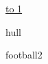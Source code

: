 \documentclass[12pt,a4paper,oneside]{article}
\newcommand{\ProblemLabel}{undefined}
\newcommand{\ProblemTL}{undefined}
\newcommand{\ProblemML}{undefined}
\newcommand{\ProblemName}{undefined}
\def\probl#1#2#3#4#5{
  \renewcommand{\ProblemName}{#2}
  \renewcommand{\ProblemLabel}{#3}
  \renewcommand{\ProblemTL}{#4}
  \renewcommand{\ProblemML}{#5}
  {#2}
}
\begin{document}
\vspace*{-2em}
\tableofcontents

\vspace*{1em}

\noindent \underline{\hbox to 1\textwidth{{ } \hfil{ } \hfil{ } }}

\pagebreak

\probl{2010-12}{hull}{A}{0.5 sec}{256 mb}      %
\probl{2012-07}{football2}{B}{0.5 sec}{256 mb} %
\end{document}
